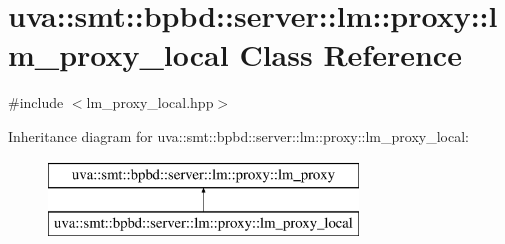 \hypertarget{classuva_1_1smt_1_1bpbd_1_1server_1_1lm_1_1proxy_1_1lm__proxy__local}{}\section{uva\+:\+:smt\+:\+:bpbd\+:\+:server\+:\+:lm\+:\+:proxy\+:\+:lm\+\_\+proxy\+\_\+local Class Reference}
\label{classuva_1_1smt_1_1bpbd_1_1server_1_1lm_1_1proxy_1_1lm__proxy__local}


{\ttfamily \#include $<$lm\+\_\+proxy\+\_\+local.\+hpp$>$}

Inheritance diagram for uva\+:\+:smt\+:\+:bpbd\+:\+:server\+:\+:lm\+:\+:proxy\+:\+:lm\+\_\+proxy\+\_\+local\+:\begin{figure}[H]
\begin{center}
\leavevmode
\includegraphics[height=2.000000cm]{classuva_1_1smt_1_1bpbd_1_1server_1_1lm_1_1proxy_1_1lm__proxy__local}
\end{center}
\end{figure}
